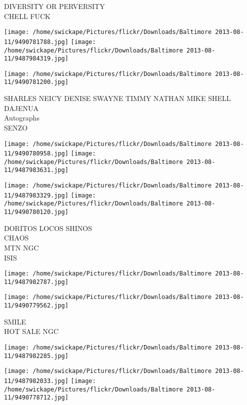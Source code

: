 \documentclass[10pt,letterpaper]{article}
\begin{document}
DIVERSITY OR PERVERSITY\\
CHELL FUCK\\
\pagebreak

\texttt{[image: /home/swickape/Pictures/flickr/Downloads/Baltimore 2013-08-11/9490781788.jpg]}
\texttt{[image: /home/swickape/Pictures/flickr/Downloads/Baltimore 2013-08-11/9487984319.jpg]}

\vspace{0.25in}
\texttt{[image: /home/swickape/Pictures/flickr/Downloads/Baltimore 2013-08-11/9490781200.jpg]}

SHARLES NEICY DENISE SWAYNE TIMMY NATHAN MIKE SHELL DAJENUA\\
Autographs\\
SENZO\\
\pagebreak

\texttt{[image: /home/swickape/Pictures/flickr/Downloads/Baltimore 2013-08-11/9490780958.jpg]}
\texttt{[image: /home/swickape/Pictures/flickr/Downloads/Baltimore 2013-08-11/9487983631.jpg]}

\texttt{[image: /home/swickape/Pictures/flickr/Downloads/Baltimore 2013-08-11/9487983329.jpg]}
\texttt{[image: /home/swickape/Pictures/flickr/Downloads/Baltimore 2013-08-11/9490780120.jpg]}

DORITOS LOCOS SHINOS\\
CHAOS\\
MTN NGC\\
ISIS\\
\pagebreak

\texttt{[image: /home/swickape/Pictures/flickr/Downloads/Baltimore 2013-08-11/9487982787.jpg]}

\vspace{0.25in}
\texttt{[image: /home/swickape/Pictures/flickr/Downloads/Baltimore 2013-08-11/9490779562.jpg]}

SMILE\\
HOT SALE NGC\\
\pagebreak

\texttt{[image: /home/swickape/Pictures/flickr/Downloads/Baltimore 2013-08-11/9487982285.jpg]}

\vspace{0.25in}
\texttt{[image: /home/swickape/Pictures/flickr/Downloads/Baltimore 2013-08-11/9487982033.jpg]}
\texttt{[image: /home/swickape/Pictures/flickr/Downloads/Baltimore 2013-08-11/9490778712.jpg]}
\end{document}
